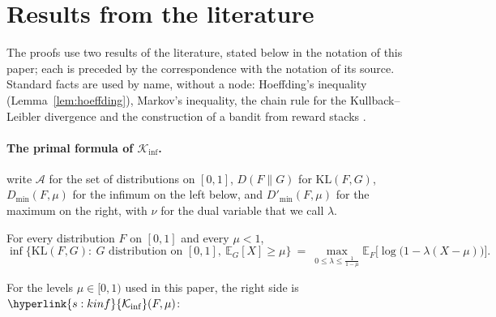 \documentclass[10pt]{article}
\newcommand{\sy}[2]{{\hyperlink{#1}{#2}}}
\newcommand{\E}{\mathbb{E}}
\newcommand{\1}{\mathbf{1}}
\newcommand{\KL}{\mathrm{KL}}
\newcommand{\Ki}{\sy{s:kinf}{\mathcal K_{\inf}}}
\begin{document}



\appendix

\section{Results from the literature}\label{sec:cited}

The proofs use two results of the literature, stated below in the notation of this paper; each is preceded by the correspondence with the notation of its source. Standard facts are used by name, without a node: Hoeffding's inequality \citep{H63}
(Lemma~\ref{lem:hoeffding}), Markov's inequality, the chain rule for the Kullback--Leibler divergence \citep[Lemma~15.1]{LS} and the construction of a bandit from reward
stacks \citep[Section~4.6]{LS}.

\paragraph{The primal formula of $\mathcal K_{\inf}$.} \citet{HT10} write $\mathcal A$ for the set of distributions on $[0,1]$, $D(F\|G)$ for $\KL(F,G)$,
$D_{\min}(F,\mu)$ for the infimum on the left below, and $D'_{\min}(F,\mu)$ for the maximum on the right, with $\nu$ for the dual variable that we call $\lambda$.

\begin{lemma}\label{cite:honda2010asymptotically-primal}
For every distribution $F$ on $[0,1]$ and every $\mu<1$,
\[
\inf\big\{\KL(F,G):\ G\text{ distribution on }[0,1],\ \E_G[X]\ge\mu\big\}\ =\ \max_{0\le\lambda\le\frac1{1-\mu}}\E_F\big[\log\big(1-\lambda(X-\mu)\big)\big].
\]
\end{lemma}

\noindent For the levels $\mu\in[0,1)$ used in this paper, the right side is $\Ki(F,\mu)$:
\end{document}

